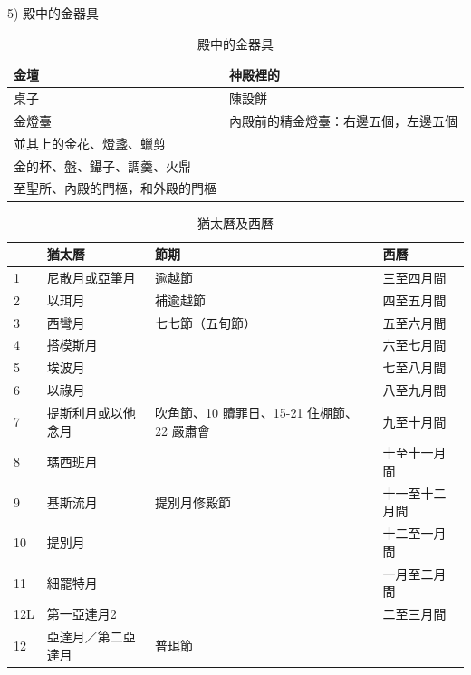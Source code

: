 \documentclass{ctexart}
\begin{document}
\begin{description}
\item   5) 殿中的金器具
\begin{table}[!hbp]
\centering 
\begin{tabular}{||p{2.5cm}|p{12cm}||}
\hline
\hline
金壇    & 神殿裡的\\\hline
桌子  &  陳設餅\\\hline
金燈臺& 內殿前的精金燈臺：右邊五個，左邊五個\\\hline
並其上的金花、燈盞、蠟剪&\\\hline
金的杯、盤、鑷子、調羹、火鼎&\\\hline
至聖所、內殿的門樞，和外殿的門樞&\\\hline
\end{tabular}
\caption{殿中的金器具}
\end{table}

\end{description}  

\begin{table}[!hbp]
\centering 
\begin{tabular}{|p{3cm}|p{3cm}|p{7cm}|p{7cm}|}
\hline
\hline
 &猶太曆 &		節期 &	西曆 \\\hline\hline
1&尼散月或亞筆月&逾越節&	三至四月間\\\hline
2&以珥月&補逾越節&	四至五月間\\\hline
3&西彎月& 七七節（五旬節）&	五至六月間\\\hline
4&搭模斯月&		&六至七月間\\\hline
5&埃波月	&	&七至八月間\\\hline
6&以祿月&&		八至九月間\\\hline
7&提斯利月或以他念月	& 吹角節、10 贖罪日、15-21 住棚節、22 嚴肅會	&九至十月間\\\hline
8&瑪西班月&	&十至十一月間\\\hline
9&基斯流月& 提別月修殿節	&十一至十二月間\\\hline
10  &提別月  &	&十二至一月間\\\hline
11  &細罷特月&	&一月至二月間\\\hline
12L &第一亞達月2&&	二至三月間\\\hline
12 &亞達月／第二亞達月& 普珥節&\\\hline
\end{tabular}
\caption{猶太曆及西曆}
\end{table}



	 
  
\end{document}
